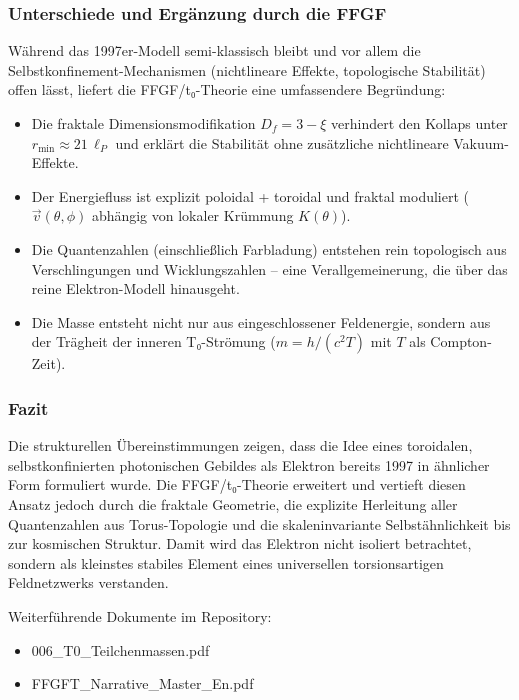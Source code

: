 	\subsubsection{Unterschiede und Ergänzung durch die FFGF}
	
	Während das 1997er-Modell semi-klassisch bleibt und vor allem die Selbstkonfinement-Mechanismen (nichtlineare Effekte, topologische Stabilität) offen lässt, liefert die FFGF/t₀-Theorie eine umfassendere Begründung:
	
	\begin{itemize}
		\item Die fraktale Dimensionsmodifikation $D_f = 3 - \xi$ verhindert den Kollaps unter $r_{\min} \approx 21\,\ell_P$ und erklärt die Stabilität ohne zusätzliche nichtlineare Vakuum-Effekte.
		\item Der Energiefluss ist explizit poloidal + toroidal und fraktal moduliert ($\vec{v}(\theta,\phi)$ abhängig von lokaler Krümmung $K(\theta)$).
		\item Die Quantenzahlen (einschließlich Farbladung) entstehen rein topologisch aus Verschlingungen und Wicklungszahlen – eine Verallgemeinerung, die über das reine Elektron-Modell hinausgeht.
		\item Die Masse entsteht nicht nur aus eingeschlossener Feldenergie, sondern aus der Trägheit der inneren T₀-Strömung ($m = h/(c^2 T)$ mit $T$ als Compton-Zeit).
	\end{itemize}
	
	\subsubsection{Fazit}
	
	Die strukturellen Übereinstimmungen zeigen, dass die Idee eines toroidalen, selbstkonfinierten photonischen Gebildes als Elektron bereits 1997 in ähnlicher Form formuliert wurde. Die FFGF/t₀-Theorie erweitert und vertieft diesen Ansatz jedoch durch die fraktale Geometrie, die explizite Herleitung aller Quantenzahlen aus Torus-Topologie und die skaleninvariante Selbstähnlichkeit bis zur kosmischen Struktur. Damit wird das Elektron nicht isoliert betrachtet, sondern als kleinstes stabiles Element eines universellen torsionsartigen Feldnetzwerks verstanden.
	
	Weiterführende Dokumente im Repository:
	\begin{itemize}
		\item 006\_T0\_Teilchenmassen.pdf
		\item FFGFT\_Narrative\_Master\_En.pdf
	\end{itemize}	
